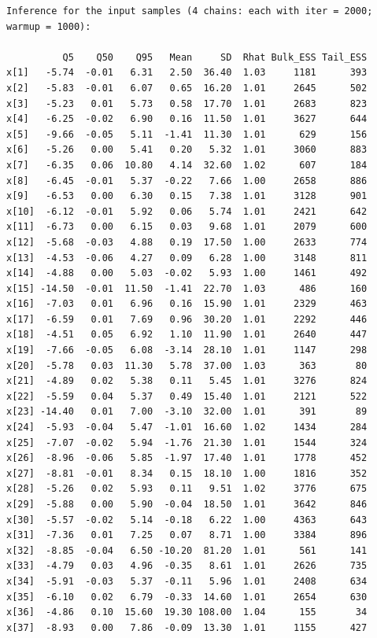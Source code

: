 \documentclass[american,]{article}
\begin{document}
\begin{verbatim}
Inference for the input samples (4 chains: each with iter = 2000; warmup = 1000):

          Q5    Q50    Q95   Mean     SD  Rhat Bulk_ESS Tail_ESS
x[1]   -5.74  -0.01   6.31   2.50  36.40  1.03     1181      393
x[2]   -5.83  -0.01   6.07   0.65  16.20  1.01     2645      502
x[3]   -5.23   0.01   5.73   0.58  17.70  1.01     2683      823
x[4]   -6.25  -0.02   6.90   0.16  11.50  1.01     3627      644
x[5]   -9.66  -0.05   5.11  -1.41  11.30  1.01      629      156
x[6]   -5.26   0.00   5.41   0.20   5.32  1.01     3060      883
x[7]   -6.35   0.06  10.80   4.14  32.60  1.02      607      184
x[8]   -6.45  -0.01   5.37  -0.22   7.66  1.00     2658      886
x[9]   -6.53   0.00   6.30   0.15   7.38  1.01     3128      901
x[10]  -6.12  -0.01   5.92   0.06   5.74  1.01     2421      642
x[11]  -6.73   0.00   6.15   0.03   9.68  1.01     2079      600
x[12]  -5.68  -0.03   4.88   0.19  17.50  1.00     2633      774
x[13]  -4.53  -0.06   4.27   0.09   6.28  1.00     3148      811
x[14]  -4.88   0.00   5.03  -0.02   5.93  1.00     1461      492
x[15] -14.50  -0.01  11.50  -1.41  22.70  1.03      486      160
x[16]  -7.03   0.01   6.96   0.16  15.90  1.01     2329      463
x[17]  -6.59   0.01   7.69   0.96  30.20  1.01     2292      446
x[18]  -4.51   0.05   6.92   1.10  11.90  1.01     2640      447
x[19]  -7.66  -0.05   6.08  -3.14  28.10  1.01     1147      298
x[20]  -5.78   0.03  11.30   5.78  37.00  1.03      363       80
x[21]  -4.89   0.02   5.38   0.11   5.45  1.01     3276      824
x[22]  -5.59   0.04   5.37   0.49  15.40  1.01     2121      522
x[23] -14.40   0.01   7.00  -3.10  32.00  1.01      391       89
x[24]  -5.93  -0.04   5.47  -1.01  16.60  1.02     1434      284
x[25]  -7.07  -0.02   5.94  -1.76  21.30  1.01     1544      324
x[26]  -8.96  -0.06   5.85  -1.97  17.40  1.01     1778      452
x[27]  -8.81  -0.01   8.34   0.15  18.10  1.00     1816      352
x[28]  -5.26   0.02   5.93   0.11   9.51  1.02     3776      675
x[29]  -5.88   0.00   5.90  -0.04  18.50  1.01     3642      846
x[30]  -5.57  -0.02   5.14  -0.18   6.22  1.00     4363      643
x[31]  -7.36   0.01   7.25   0.07   8.71  1.00     3384      896
x[32]  -8.85  -0.04   6.50 -10.20  81.20  1.01      561      141
x[33]  -4.79   0.03   4.96  -0.35   8.61  1.01     2626      735
x[34]  -5.91  -0.03   5.37  -0.11   5.96  1.01     2408      634
x[35]  -6.10   0.02   6.79  -0.33  14.60  1.01     2654      630
x[36]  -4.86   0.10  15.60  19.30 108.00  1.04      155       34
x[37]  -8.93   0.00   7.86  -0.09  13.30  1.01     1155      427

\end{verbatim}
\end{document}
